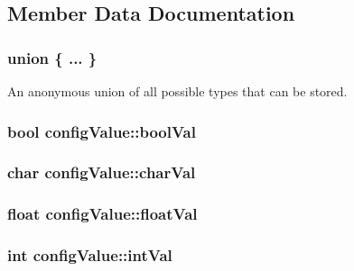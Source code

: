 \subsection{Member Data Documentation}
\hypertarget{structconfigValue_a0dba5866afbc59ae85680fd2a13c80ad}{\subsubsection[{"@1}]{\setlength{\rightskip}{0pt plus 5cm}union \{ ... \} }}\label{structconfigValue_a0dba5866afbc59ae85680fd2a13c80ad}
An anonymous union of all possible types that can be stored. \hypertarget{structconfigValue_a559a52e0234967d6fb4c0e58030de255}{
\subsubsection[{bool\-Val}]{\setlength{\rightskip}{0pt plus 5cm}bool config\-Value\-::bool\-Val}}\label{structconfigValue_a559a52e0234967d6fb4c0e58030de255}
\hypertarget{structconfigValue_a21dd817d08a5648100732180b81f714e}{
\subsubsection[{char\-Val}]{\setlength{\rightskip}{0pt plus 5cm}char config\-Value\-::char\-Val}}\label{structconfigValue_a21dd817d08a5648100732180b81f714e}
\hypertarget{structconfigValue_a5ee65a7274dd76adc86467789da27075}{
\subsubsection[{float\-Val}]{\setlength{\rightskip}{0pt plus 5cm}float config\-Value\-::float\-Val}}\label{structconfigValue_a5ee65a7274dd76adc86467789da27075}
\hypertarget{structconfigValue_a85f3ab82fc453795a31914bec4bfa877}{
\subsubsection[{int\-Val}]{\setlength{\rightskip}{0pt plus 5cm}int config\-Value\-::int\-Val}}\label{structconfigValue_a85f3ab82fc453795a31914bec4bfa877}
